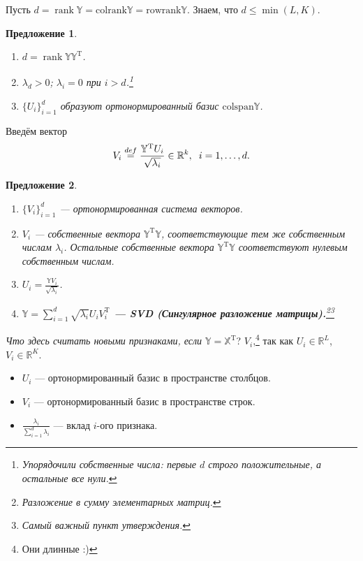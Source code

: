 \documentclass[specialist, 12pt,
subf, %
href, colorlinks=true,
substylefile = spbu.rtx,
]{disser}
\newtheorem{proposition}{Предложение}
\DeclareMathOperator{\rnk}{rank}
\begin{document}
Пусть $d = \rnk \mathbb{Y} = \mathrm{colrank} \mathbb{Y} = \mathrm{rowrank}\mathbb{Y}$. Знаем, что $d \leq \min (L,K)$.
\begin{proposition}
\begin{enumerate}
	\item $d = \rnk \mathbb{Y} \mathbb{Y}^{\mathrm{T}}$.
	\item $\lambda_d > 0$; $\lambda_i = 0$ при $i > d$.\footnote{Упорядочили собственные числа: первые $d$ строго положительные, а остальные все нули.}
	\item $\{U_i\}_{i = 1}^d$ образуют ортонормированный базис $\mathrm{colspan} \mathbb{Y}$.
\end{enumerate}	
\end{proposition}

Введём вектор
\begin{gather*}
V_i \stackrel{def}{=} \frac{\mathbb{Y}^{\mathrm{T}}U_i}{\sqrt{\lambda_i}} \in \mathbb{R}^k, \hspace{0.2 cm} i = 1, \ldots, d.
\end{gather*}
\begin{proposition}
	\begin{enumerate}
		\item $\{V_i\}_{i = 1}^d$ --- ортонормированная система векторов.
		\item $V_i$ --- собственные вектора $ \mathbb{Y}^{\mathrm{T}}\mathbb{Y}$, соответствующие тем же собственным числам $\lambda_i$. Остальные собственные вектора $ \mathbb{Y}^{\mathrm{T}}\mathbb{Y}$ соответствуют нулевым собственным числам.
		\item $U_i = \displaystyle{\frac{\mathbb{Y}V_i}{\sqrt{\lambda_i}}}$.
		\item \textbf{$\mathbb{Y} = \sum\limits_{i = 1}^d \sqrt{\lambda_i} U_i V_i^{\mathrm{T}}$ --- SVD (Сингулярное разложение матрицы).}\footnote{Разложение в сумму элементарных матриц.}\footnote{Самый важный пункт утверждения.}
	\end{enumerate}
\end{proposition}
\textit{Что здесь считать новыми признаками, если $\mathbb{Y} = \mathbb{X}^{\mathrm{T}}$}? $V_i$,\footnote{Они длинные :)} так как $U_i \in \mathbb{R}^L$, $V_i \in \mathbb{R}^K$.
\begin{itemize}
	\item $U_i$ --- ортонормированный базис в пространстве столбцов.
	\item $V_i$ --- ортонормированный базис в пространстве строк.
	\item $\displaystyle\frac{\lambda_i}{\sum_{i=1}^d \lambda_i}$ --- вклад $i$-ого признака.
\end{itemize}
\end{document}
